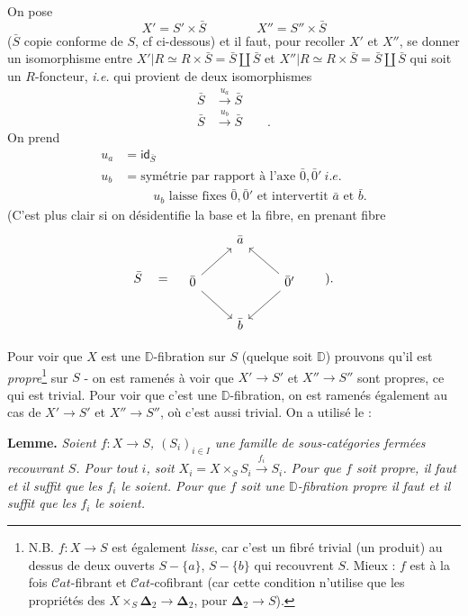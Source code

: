 \documentclass[11pt,leqno]{article}
\newcommand{\msp}[1]{\marginpar{\footnotesize [#1]}}
\newcommand{\D}{\mathbb{D}}
\newcommand{\Cat}{\mathcal{C}at}
\begin{document}
\msp{page 88}
On pose
\[ X' = S' \times \bar S \qquad\qquad X'' = S'' \times \bar S \]
($\bar S$ copie conforme de $S$, cf ci-dessous) et il faut, pour recoller $X'$ et $X''$, se donner un isomorphisme entre $X'|R \simeq R \times \bar S = \bar S \amalg \bar S$ et $X''|R \simeq R \times \bar S = \bar S \amalg \bar S$ qui soit un $R$-foncteur, \textit{i.e.} qui provient de deux isomorphismes
\[
\begin{aligned}
\bar S &\xrightarrow{u_a} \bar S \\
\bar S &\xrightarrow{u_b} \bar S \qquad .
\end{aligned}
\]
On prend
\[
\begin{aligned}
u_a &= \mathsf{id}_{\bar S} \\
u_b &= \text{symétrie par rapport à l'axe } \bar 0, \bar 0' \ \textit{i.e.} %
\\
&\phantom{=}\quad u_b \text{ laisse fixes } \bar 0, \bar 0' \text{ et intervertit } \bar a \text{ et } \bar b.
\end{aligned}
\]
(C'est plus clair si on désidentifie la base et la fibre, en prenant fibre
\[
\bar S \quad = \quad
\begin{tikzcd}
 & \bar a & \\
\bar 0 \arrow[ur] \arrow[dr] & & \bar 0' \arrow[ul] \arrow[dl] \\
 & \bar b &
\end{tikzcd}
\qquad ).
\]

Pour voir que $X$ est une $\D$-fibration sur $S$ (quelque soit $\D$) prouvons qu'il est \textit{propre}\footnote[45]{N.B. $f : X \to S$ est également \textit{lisse}, car c'est un fibré trivial (un produit) au dessus de deux ouverts $S - \{a\}$, $S - \{b\}$ qui recouvrent $S$. Mieux : $f$ est à la fois $\Cat$-fibrant et $\Cat$-cofibrant (car cette condition n'utilise que les propriétés des $X \times_S \mathbf{\Delta}_2 \to \mathbf{\Delta}_2$, pour $\mathbf{\Delta}_2 \to S$).} sur $S$ - on est ramenés à voir que $X' \to S'$ et $X'' \to S''$ sont propres, ce qui est trivial. Pour voir que c'est une $\D$-fibration, on est ramenés également au cas de $X' \to S'$ et $X'' \to S''$, où c'est aussi trivial. On a utilisé le : %

\textbf{Lemme.} \textit{Soient $f : X \to S$, $(S_i)_{i \in I}$ une famille de sous-catégories fermées recouvrant $S$. Pour tout $i$, soit $X_i = X \times_S S_i \xrightarrow{f_i} S_i$. Pour que $f$ soit propre, il faut et il suffit que les $f_i$ le soient. Pour que $f$ soit une $\D$-fibration propre il faut et il suffit que les $f_i$ le soient.}
\end{document}
